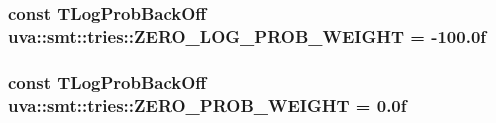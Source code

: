 \subsubsection[{Z\+E\+R\+O\+\_\+\+L\+O\+G\+\_\+\+P\+R\+O\+B\+\_\+\+W\+E\+I\+G\+H\+T}]{\setlength{\rightskip}{0pt plus 5cm}const {\bf T\+Log\+Prob\+Back\+Off} uva\+::smt\+::tries\+::\+Z\+E\+R\+O\+\_\+\+L\+O\+G\+\_\+\+P\+R\+O\+B\+\_\+\+W\+E\+I\+G\+H\+T = -\/100.\+0f}\label{namespaceuva_1_1smt_1_1tries_a60f325085f4d50c378efc2809a6fecc0}
\hypertarget{namespaceuva_1_1smt_1_1tries_ab01df7aece204ae7147b6bdaa36b0aec}{}
\subsubsection[{Z\+E\+R\+O\+\_\+\+P\+R\+O\+B\+\_\+\+W\+E\+I\+G\+H\+T}]{\setlength{\rightskip}{0pt plus 5cm}const {\bf T\+Log\+Prob\+Back\+Off} uva\+::smt\+::tries\+::\+Z\+E\+R\+O\+\_\+\+P\+R\+O\+B\+\_\+\+W\+E\+I\+G\+H\+T = 0.\+0f}\label{namespaceuva_1_1smt_1_1tries_ab01df7aece204ae7147b6bdaa36b0aec}
